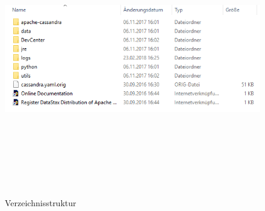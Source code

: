\documentclass[a4paper, 12pt]{scrartcl}
\begin{document}
\begin{description}
\begin{enumerate}
\begin{figure}[H]
\centering
\includegraphics[height=12cm, width=15cm, keepaspectratio]{cass2.png}
\caption{Verzeichnisstruktur}
\end{figure}    


   \end{enumerate}  
  
\end{description}
\end{document}
